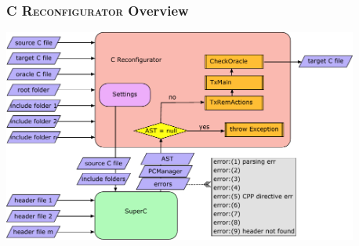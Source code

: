 \documentclass{beamer}
\title{\CReconfig}
\author{Alexandru F. Iosif-Lazăr}
\institute{ITU Copenhagen}
\date{26-04-2017}
\newcommand{\CReconfig}{\textsc{C Reconfigurator}\xspace}
\begin{document}
	
	\frame{\titlepage}
	
	\begin{frame}
		\frametitle{\CReconfig Overview}
		
		\centering
		\includegraphics[height=7cm]{img/Fig1.pdf}
		
	\end{frame}
\end{document}
